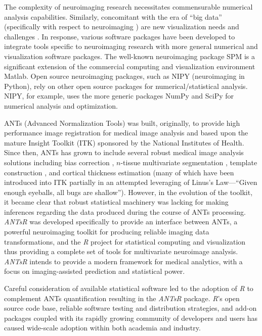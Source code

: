 The complexity of neuroimaging research necessitates 
commensurable numerical analysis capabilities.  Similarly, concomitant
with the era of ``big data'' (specifically with respect to neuroimaging
\citep{vanhorn2013}) are new visualization needs and challenges
\citep{childs2013,kehrer2013}.
In response, various software packages have been developed to
integrate tools specific to neuroimaging research with more general
numerical and visualization software packages.
The well-known neuroimaging package SPM
is a significant extension of the commercial computing and visualization environment
Matlab.  Open source neuroimaging packages, such as NIPY (neuroimaging in Python),
rely on other open source packages for numerical/statistical analysis.  NIPY,
for example, uses the more generic packages NumPy and SciPy for numerical analysis and 
optimization.

ANTs (Advanced Normalization Tools) was built, originally, to provide 
high performance image registration for medical image analysis
\citep{avants2008a} and based upon the mature Insight Toolkit (ITK)
sponsored by the National Institutes of Health.  Since then, ANTs has grown to include 
several robust medical image analysis solutions including bias 
correction \citep{tustison2010}, $n$-tissue multivariate segmentation 
\citep{avants2011}, template construction \citep{avants2010}, and cortical 
thickness estimation \citep{das2009} (many of which have been
introduced into ITK partially in an attempted leveraging of Linus's Law---``Given enough eyeballs, all bugs are shallow'').  
However, in the evolution of the toolkit, it became clear 
that robust statistical machinery was lacking for making inferences regarding
the data produced during the course of ANTs processing.  \textit{ANTsR} was developed
specifically to provide an interface between ANTs, a 
powerful neuroimaging toolkit for producing reliable imaging data 
transformations, and the \textit{R} project
for statistical computing and visualization thus providing a complete
set of tools for multivariate neuroimage analysis.  
 \textit{ANTsR} intends to provide a modern framework for medical analytics, 
 with a focus on imaging-assisted prediction and statistical power.


Careful consideration of available statistical software 
led to the adoption of \textit{R} to complement ANTs quantification resulting in the
\textit{ANTsR} package.
\textit{R}'s open source code base, reliable software testing and distribution strategies,
and add-on packages coupled with its rapidly growing 
community of developers and users has caused wide-scale
adoption within both academia and industry.

